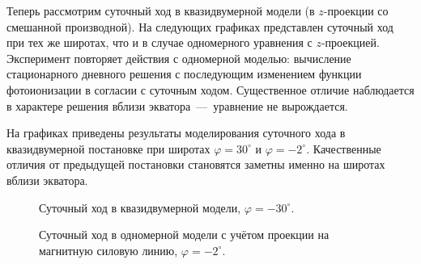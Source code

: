 \documentclass[14pt, a4paper, fleqn]{extarticle}
\begin{document}
Теперь рассмотрим суточный ход в квазидвумерной модели (в $z$-проекции со смешанной производной). На следующих графиках представлен суточный ход при тех же широтах, что и в случае одномерного уравнения с $z$-проекцией. Эксперимент повторяет действия с одномерной моделью: вычисление стационарного дневного решения с последующим изменением функции фотоионизации в согласии с суточным ходом. Существенное отличие наблюдается в характере решения вблизи экватора~---~уравнение не вырождается. 

На графиках приведены результаты моделирования суточного хода в квазидвумерной постановке при широтах $\varphi = 30^\circ$ и $\varphi = -2^\circ$. Качественные отличия от предыдущей постановки становятся заметны именно на широтах вблизи экватора. 


\begin{figure}[H]
\caption{Суточный ход в квазидвумерной модели, $\varphi = -30^\circ$.}
\end{figure}

\begin{figure}[H]
\caption{Суточный ход в одномерной модели с учётом проекции на магнитную силовую линию, $\varphi = -2^\circ$.}
\end{figure}
\end{document}
